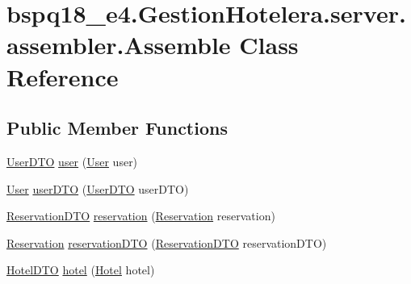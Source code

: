 \hypertarget{classbspq18__e4_1_1_gestion_hotelera_1_1server_1_1assembler_1_1_assemble}{}\section{bspq18\+\_\+e4.\+Gestion\+Hotelera.\+server.\+assembler.\+Assemble Class Reference}
\label{classbspq18__e4_1_1_gestion_hotelera_1_1server_1_1assembler_1_1_assemble}
\subsection*{Public Member Functions}
\begin{DoxyCompactItemize}
\item 
\mbox{\hyperlink{classbspq18__e4_1_1_gestion_hotelera_1_1server_1_1dto_1_1_user_d_t_o}{User\+D\+TO}} \mbox{\hyperlink{classbspq18__e4_1_1_gestion_hotelera_1_1server_1_1assembler_1_1_assemble_af4eedaae8d84b61c96063951750dd65c}{user}} (\mbox{\hyperlink{classbspq18__e4_1_1_gestion_hotelera_1_1server_1_1data_1_1_user}{User}} user)
\item 
\mbox{\hyperlink{classbspq18__e4_1_1_gestion_hotelera_1_1server_1_1data_1_1_user}{User}} \mbox{\hyperlink{classbspq18__e4_1_1_gestion_hotelera_1_1server_1_1assembler_1_1_assemble_ac77b93be577e0042a811486117d9e67a}{user\+D\+TO}} (\mbox{\hyperlink{classbspq18__e4_1_1_gestion_hotelera_1_1server_1_1dto_1_1_user_d_t_o}{User\+D\+TO}} user\+D\+TO)
\item 
\mbox{\hyperlink{classbspq18__e4_1_1_gestion_hotelera_1_1server_1_1dto_1_1_reservation_d_t_o}{Reservation\+D\+TO}} \mbox{\hyperlink{classbspq18__e4_1_1_gestion_hotelera_1_1server_1_1assembler_1_1_assemble_a70f64588a0001be44576e19cf9fd5819}{reservation}} (\mbox{\hyperlink{classbspq18__e4_1_1_gestion_hotelera_1_1server_1_1data_1_1_reservation}{Reservation}} reservation)
\item 
\mbox{\hyperlink{classbspq18__e4_1_1_gestion_hotelera_1_1server_1_1data_1_1_reservation}{Reservation}} \mbox{\hyperlink{classbspq18__e4_1_1_gestion_hotelera_1_1server_1_1assembler_1_1_assemble_afb60ad53a4a191206c362b7eee5f0781}{reservation\+D\+TO}} (\mbox{\hyperlink{classbspq18__e4_1_1_gestion_hotelera_1_1server_1_1dto_1_1_reservation_d_t_o}{Reservation\+D\+TO}} reservation\+D\+TO)
\item 
\mbox{\hyperlink{classbspq18__e4_1_1_gestion_hotelera_1_1server_1_1dto_1_1_hotel_d_t_o}{Hotel\+D\+TO}} \mbox{\hyperlink{classbspq18__e4_1_1_gestion_hotelera_1_1server_1_1assembler_1_1_assemble_a31efbae8fbea50786103a46be8f56895}{hotel}} (\mbox{\hyperlink{classbspq18__e4_1_1_gestion_hotelera_1_1server_1_1data_1_1_hotel}{Hotel}} hotel)

\end{DoxyCompactItemize}
